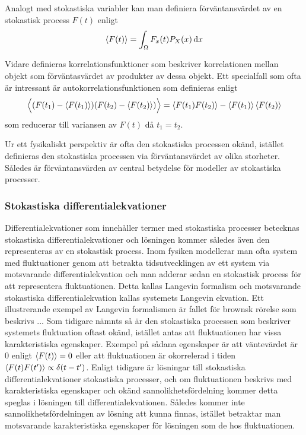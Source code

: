 Analogt med stokastiska variabler kan man definiera förväntansvärdet av en stokastisk process $F(t)$ enligt 
\begin{equation}
    \ev{F(t)} = \int_{\Omega} F_x(t)P_X(x) \id{x}
\end{equation}

Vidare definieras korrelationsfunktioner som beskriver korrelationen
mellan objekt som förväntasvärdet av produkter av dessa objekt. Ett
specialfall som ofta är intressant är
autokorrelationsfunktionen 
som definieras enligt
\begin{equation}
\Big\langle(F(t_1)-\ev{F(t_1)})(F(t_2)-\ev{F(t_2)})\Big\rangle 
= \ev{F(t_1)F(t_2)} - \ev{F(t_1)}\ev{F(t_2)}
\end{equation}
som reducerar till variansen av $F(t)$ då $t_1=t_2$.

Ur ett fysikaliskt perspektiv är ofta den stokastiska processen okänd, istället definieras den stokastiska processen via förväntansvärdet av olika storheter. Således är förväntansvärden av central betydelse för modeller av stokastiska processer. 


\subsubsection{Stokastiska differentialekvationer}
Differentialekvationer som innehåller termer med stokastiska processer
betecknas stokastiska differentialekvationer och lösningen kommer
således även den representeras av en stokastisk process. 
Inom fysiken modellerar man ofta system med fluktuationer genom att betrakta
tidsutvecklingen av ett system via motsvarande differentialekvation
och man adderar sedan en stokastisk process för att representera
fluktuationen. 
Detta kallas Langevin formalism och motsvarande
stokastiska differentialekvation kallas systemets Langevin ekvation. Ett
illustrerande exempel av Langevin formalismen är fallet för brownsk
rörelse som beskrivs ... 
Som tidigare nämnts så är den stokastiska
processen som beskriver systemets fluktuation oftast okänd, istället
antas att fluktuationen har vissa karakteristiska egenskaper. Exempel
på sådana egenskaper är att väntevärdet är $0$ enligt $\ev{F(t)} = 0$
eller att fluktuationen är okorrelerad i tiden
$\ev{F(t)F(t')}\propto\delta(t-t')$. Enligt tidigare
 är lösningar till
stokastiska differentialekvationer stokastiska processer, och om
fluktuationen beskrivs med karakteristiska egenskaper och okänd
sannolikhetsfördelning kommer detta speglas i lösningen till
differentialekvationen. Således kommer inte sannolikhetsfördelningen
av lösning att kunna finnas, istället betraktar man motsvarande
karakteristiska egenskaper för lösningen som de hos
fluktuationen.  

